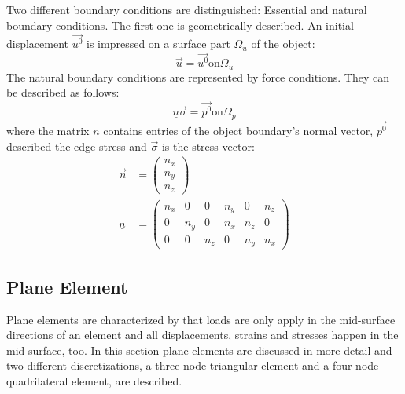  Two different boundary conditions are distinguished: Essential and natural boundary conditions. The first one is geometrically described. An initial displacement $\vec{u^0}$ is impressed on a surface part $\Omega_u$ of the object:
 \begin{equation}
 \vec{u} = \vec{u^0} \text{on} \Omega_u
 \end{equation}
 The natural boundary conditions are represented by force conditions. They can be described as follows:
 \begin{equation}
 \underline{n} \vec{\sigma} = \vec{p^0} \text{on} \Omega_p
 \end{equation}
 where the matrix $\underline{n}$ contains entries of the object boundary's normal vector, $\vec{p^0}$ described the edge stress and $\vec{\sigma}$ is the stress vector:
 \begin{align}
 \vec{n} &= \begin{pmatrix}
 n_x\\n_y\\n_z
 \end{pmatrix}\\
 \underline{n} &= \begin{pmatrix}
 n_x & 0 & 0 & n_y & 0 & n_z\\
 0 & n_y & 0 & n_x & n_z & 0\\
 0 & 0 & n_z & 0 & n_y & n_x
 \end{pmatrix}
 \end{align}
 
 
 
 \subsection{Plane Element}\label{sec:Shell-Plane}
  Plane elements are characterized by that loads are only apply in the mid-surface directions of an element and all displacements, strains and stresses happen in the mid-surface, too. In this section plane elements are discussed in more detail and two different discretizations, a three-node triangular element and a four-node quadrilateral element, are described.
  
  
